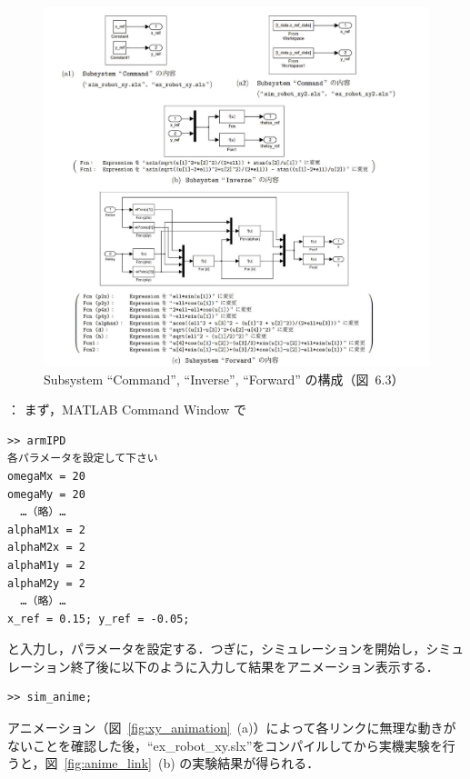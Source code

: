 \begin{figure}[h]
    \centering
    \includegraphics[width=0.95\linewidth]{figure/subsystem_all.pdf}
    \caption{Subsystem ``Command'', ``Inverse'', ``Forward'' の構成（図~6.3）}
    \label{fig:subsystems}
\end{figure}

： まず，MATLAB Command Window で

\begin{tcolorbox}[colback=white!95!gray!5, colframe=black!75, fontupper=\ttfamily, title=]
\begin{verbatim}
>> armIPD
各パラメータを設定して下さい
omegaMx = 20
omegaMy = 20
  …（略）…
alphaM1x = 2
alphaM2x = 2
alphaM1y = 2
alphaM2y = 2
  …（略）…
x_ref = 0.15; y_ref = -0.05;
\end{verbatim}
\end{tcolorbox}

と入力し，パラメータを設定する．つぎに，シミュレーションを開始し，シミュレーション終了後に以下のように入力して結果をアニメーション表示する．

\begin{tcolorbox}[colback=white!95!gray!5, colframe=black!75, fontupper=\ttfamily, title=]
\begin{verbatim}
>> sim_anime;
\end{verbatim}
\end{tcolorbox}

アニメーション（図~\ref{fig:xy_animation}~(a)）によって各リンクに無理な動きがないことを確認した後，``ex\_robot\_xy.slx''をコンパイルしてから実機実験を行うと，図~\ref{fig:anime_link}~(b) の実験結果が得られる．

